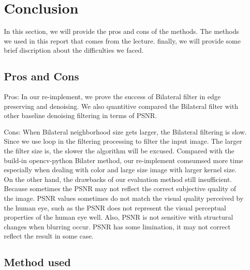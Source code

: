 \documentclass[12pt]{article}
\begin{document}
%




\section{Conclusion}
\label{section conclusion}
In this section, we will provide the pros and cons of the methods.
The methods we used in this report that comes from the lecture.
finally, we will provide some brief discription about the difficulties we faced.

\subsection{Pros and Cons}
Pros:
In our re-implement, we prove the success of Bilateral filter in edge preserving and  denoising. 
We also quantitive compared the Bilateral filter with other baseline denoising filtering in terms of PSNR. 

Cons:
When Bilateral neighborhood size gets larger, the Bilateral filtering is slow.
Since we use loop in the filtering processing to filter the input image. 
The larger the filter size is, the slower the algorithm will be excused.
Compared with the build-in opencv-python Bilater method, our re-implement comsumsed more time especially when dealing with color and large size image with larger kernel size.
On the other hand, the drawbacks of our evaluation method still insufficient. 
Because sometimes the PSNR may not reflect the correct subjective quality of the image.
PSNR values sometimes do not match the visual quality perceived by the human eye, such as the PSNR does not represent the visual perceptual properties of the human eye well.
Also, PSNR is not sensitive with structural changes when blurring occur.  
PSNR has some limination, it may not correct reflect the result in some case.

\subsection{Method used}
\end{document}
